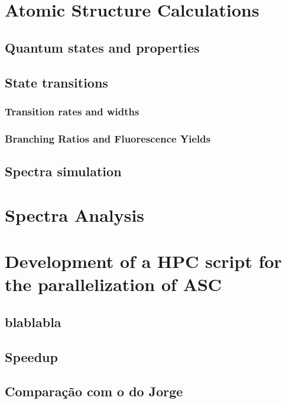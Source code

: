 
%


\chapter{Atomic Structure Calculations}\label{cha:atom_calc}

\section{Quantum states and properties}

\section{State transitions}

\subsection{Transition rates and widths}
\subsection{Branching Ratios and Fluorescence Yields}

\section{Spectra simulation}

\chapter{Spectra Analysis}

\chapter{Development of a \gls{HPC} script for the parallelization of \gls{ASC}}

\section{blablabla}

\section{Speedup}
\section{Comparação com o do Jorge}

